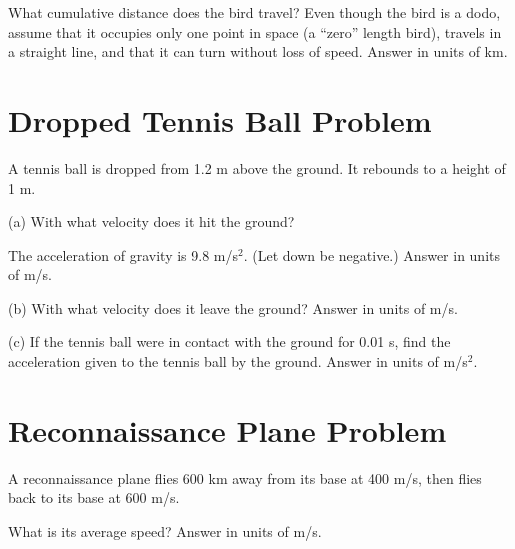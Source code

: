\documentclass[../physics12.tex]{subfiles}
\begin{document}
What cumulative distance does the bird travel? Even though the bird is a dodo, assume that it occupies only one point in space (a ``zero'' length bird), travels in a straight line, and that it can turn without loss of speed.
Answer in units of km.

\section{Dropped Tennis Ball Problem}
A tennis ball is dropped from 1.2 m above the ground. It rebounds to a height of 1 m. 

(a) With what velocity does it hit the ground? 

The acceleration of gravity is 9.8 m/s$^2$. (Let down be negative.)
Answer in units of m/s.

(b) With what velocity does it leave the ground? 
Answer in units of m/s.

(c) If the tennis ball were in contact with the ground for 0.01 s, find the acceleration given to the tennis ball by the ground.
Answer in units of m/s$^2$.

\section{Reconnaissance Plane Problem}
A reconnaissance plane flies 600 km away from its base at 400 m/s, then flies back to its base at 600 m/s. 

What is its average speed?
Answer in units of m/s.
\end{document}
